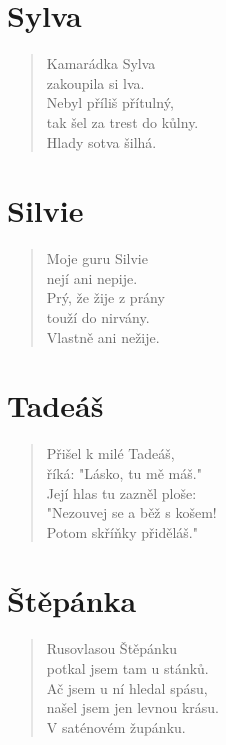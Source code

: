 \section*{Sylva}
\begin{verse}
Kamarádka Sylva\\
zakoupila si lva.\\
Nebyl příliš přítulný,\\
tak šel za trest do kůlny.\\
Hlady sotva šilhá.
\end{verse}

\section*{Silvie}
\begin{verse}
Moje guru Silvie\\
nejí ani nepije.\\
Prý, že žije z prány\\
touží do nirvány.\\
Vlastně ani nežije.
\end{verse}

\section*{Tadeáš}
\begin{verse}
Přišel k milé Tadeáš,\\
říká: "Lásko, tu mě máš."\\
Její hlas tu zazněl ploše:\\
"Nezouvej se a běž s košem!\\
Potom skříňky přiděláš."
\end{verse}

\section*{Štěpánka}
\begin{verse}
Rusovlasou Štěpánku\\
potkal jsem tam u stánků.\\
Ač jsem u ní hledal spásu,\\
našel jsem jen levnou krásu.\\
V saténovém župánku.
\end{verse}

